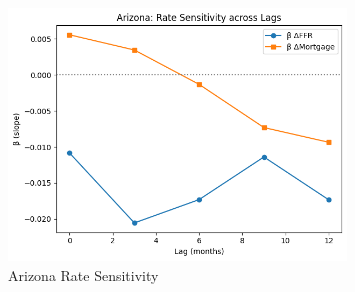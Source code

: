 \documentclass[12pt, stu, abstract]{apa7}
\begin{document}
\begin{appendices}
\begin{figure}[htbp]
    \centering
    \includegraphics[width=0.8\textwidth]{../figs/az_rate_sens.png}
    \caption{Arizona Rate Sensitivity}
    \label{fig:az_rate_sens}
\end{figure}

\end{appendices}
\end{document}
